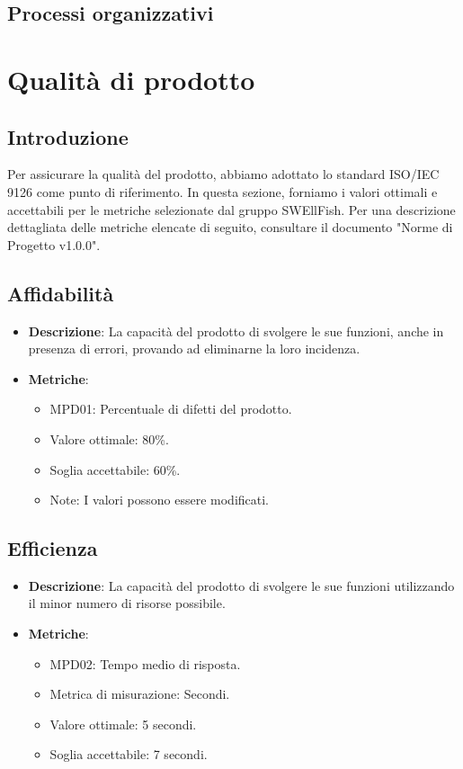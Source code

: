 \documentclass[12pt]{article}
\begin{document}
\subsection{Processi organizzativi}

\section{Qualità di prodotto}
\subsection{Introduzione}
Per assicurare la qualità del prodotto, abbiamo adottato lo standard ISO/IEC 9126 come punto di riferimento. In questa sezione, forniamo i valori ottimali e accettabili per le metriche selezionate dal gruppo SWEllFish. Per una descrizione dettagliata delle metriche elencate di seguito, consultare il documento "Norme di Progetto v1.0.0".

\subsection{Affidabilità}
\begin{itemize}
	\item \textbf{Descrizione}: La capacità del prodotto di svolgere le sue funzioni, anche in presenza di errori, provando ad eliminarne la loro incidenza.
	\item \textbf{Metriche}:
	      \begin{itemize}
		      \item MPD01: Percentuale di difetti del prodotto.
		      \item Valore ottimale: 80\%.
		      \item Soglia accettabile: 60\%.
		      \item Note: I valori possono essere modificati.
	      \end{itemize}
\end{itemize}

\subsection{Efficienza}
\begin{itemize}
	\item \textbf{Descrizione}: La capacità del prodotto di svolgere le sue funzioni utilizzando il minor numero di risorse possibile.
	\item \textbf{Metriche}:
	      \begin{itemize}
		      \item MPD02: Tempo medio di risposta.
		      \item Metrica di misurazione: Secondi.
		      \item Valore ottimale: 5 secondi.
		      \item Soglia accettabile: 7 secondi.
	      \end{itemize}
\end{itemize}
\end{document}
